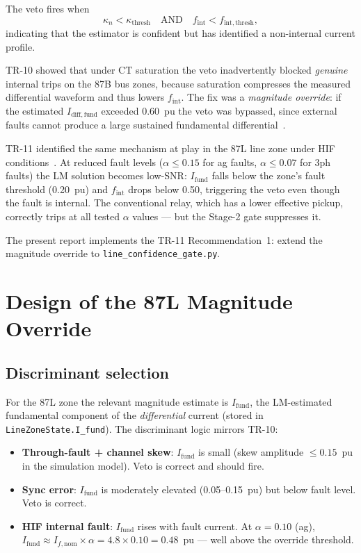 \documentclass[11pt,a4paper]{article}
\newcommand{\Ifund}{I_{\mathrm{fund}}}
\newcommand{\fint}{f_{\mathrm{int}}}
\newcommand{\kappan}{\kappa_n}
\begin{document}
The veto fires when
\begin{equation}
  \kappan < \kappa_{\mathrm{thresh}}
  \quad\text{AND}\quad
  \fint < f_{\mathrm{int,thresh}},
  \label{eq:veto_base}
\end{equation}
indicating that the estimator is confident but has identified a
non-internal current profile.

TR-10 showed that under CT saturation the veto inadvertently blocked
\emph{genuine} internal trips on the 87B bus zones, because saturation
compresses the measured differential waveform and thus lowers $\fint$.  The
fix was a \emph{magnitude override}: if the estimated $I_{\mathrm{diff,fund}}$
exceeded 0.60~pu the veto was bypassed, since external faults cannot produce
a large sustained fundamental differential~\cite{SAMBP_TR10}.

TR-11 identified the same mechanism at play in the 87L line zone under HIF
conditions~\cite{SAMBP_TR11}.  At reduced fault levels ($\alpha \leq 0.15$
for ag faults, $\alpha \leq 0.07$ for 3ph faults) the LM solution becomes
low-SNR: $\Ifund$ falls below the zone's fault threshold (0.20~pu) and $\fint$
drops below 0.50, triggering the veto even though the fault is internal.
The conventional relay, which has a lower effective pickup, correctly trips
at all tested $\alpha$ values — but the Stage-2 gate suppresses it.

The present report implements the TR-11 Recommendation~1: extend the
magnitude override to \texttt{line\_confidence\_gate.py}.

\section{Design of the 87L Magnitude Override}
\label{sec:design}

\subsection{Discriminant selection}

For the 87L zone the relevant magnitude estimate is $\Ifund$, the LM-estimated
fundamental component of the \emph{differential} current (stored in
\texttt{LineZoneState.I\_fund}).  The discriminant logic mirrors TR-10:
\begin{itemize}
  \item \textbf{Through-fault + channel skew}: $\Ifund$ is small (skew
        amplitude $\leq 0.15$~pu in the simulation model).  Veto is correct
        and should fire.
  \item \textbf{Sync error}: $\Ifund$ is moderately elevated (0.05--0.15~pu)
        but below fault level.  Veto is correct.
  \item \textbf{HIF internal fault}: $\Ifund$ rises with fault current.  At
        $\alpha = 0.10$ (ag), $\Ifund \approx I_{f,\mathrm{nom}} \times \alpha
        = 4.8 \times 0.10 = 0.48$~pu — well above the override threshold.
\end{itemize}
\end{document}
